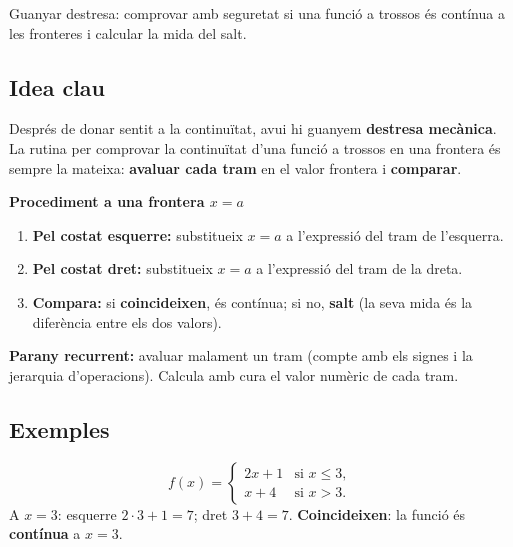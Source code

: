 %
{Guanyar destresa: comprovar amb seguretat si una funció a trossos és contínua a les fronteres i calcular la mida del salt.}

\subsection{Idea clau}

Després de donar sentit a la continuïtat, avui hi guanyem \textbf{destresa mecànica}.
La rutina per comprovar la continuïtat d'una funció a trossos en una frontera és
sempre la mateixa: \textbf{avaluar cada tram} en el valor frontera i \textbf{comparar}.

\begin{idea}
\textbf{Procediment a una frontera $x=a$}
\begin{enumerate}[leftmargin=1.6em, itemsep=2pt]
  \item \textbf{Pel costat esquerre:} substitueix $x=a$ a l'expressió del tram de
        l'esquerra.
  \item \textbf{Pel costat dret:} substitueix $x=a$ a l'expressió del tram de la dreta.
  \item \textbf{Compara:} si \textbf{coincideixen}, és contínua; si no,
        \textbf{salt} (la seva mida és la diferència entre els dos valors).
\end{enumerate}
\textbf{Parany recurrent:} avaluar malament un tram (compte amb els signes i la
jerarquia d'operacions). Calcula amb cura el valor numèric de cada tram.
\end{idea}

\subsection{Exemples}

\begin{exemple}
\[
f(x)=
\begin{cases}
2x+1 & \text{si } x\le 3,\\[2pt]
x+4 & \text{si } x>3.
\end{cases}
\]
A $x=3$: esquerre $2\cdot 3+1=7$; dret $3+4=7$. \textbf{Coincideixen}: la funció és
\textbf{contínua} a $x=3$.
\end{exemple}

